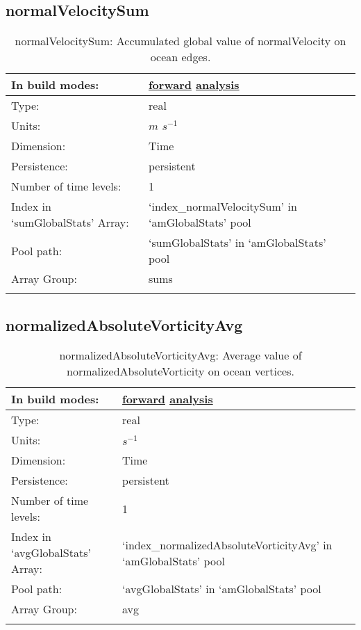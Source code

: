 \subsection[normalVelocitySum]{normalVelocitySum}
\label{subsec:var_sec_amGlobalStats_normalVelocitySum}
\begin{center}
\begin{longtable}{| p{2.0in} | p{4.0in} |}
        \hline 
        In build modes: & \hyperref[subsec:forward_var_tab_amGlobalStats]{forward} \hyperref[subsec:analysis_var_tab_amGlobalStats]{analysis} \\
        \hline 
        Type: & real \\
        \hline 
        Units: & $m$ $s^{-1}$ \\
        \hline 
        Dimension: & Time \\
        \hline 
        Persistence: & persistent \\
        \hline 
        Number of time levels: & 1 \\
        \hline 
		 Index in `sumGlobalStats' Array: & `index\_normalVelocitySum' in `amGlobalStats' pool \\
		 \hline 
            Pool path: & `sumGlobalStats' in `amGlobalStats' pool \\
		 \hline 
		 Array Group: & sums \\
		 \hline 
    \caption{normalVelocitySum: Accumulated global value of normalVelocity on ocean edges.}
\end{longtable}
\end{center}
\subsection[normalizedAbsoluteVorticityAvg]{normalizedAbsoluteVorticityAvg}
\label{subsec:var_sec_amGlobalStats_normalizedAbsoluteVorticityAvg}
\begin{center}
\begin{longtable}{| p{2.0in} | p{4.0in} |}
        \hline 
        In build modes: & \hyperref[subsec:forward_var_tab_amGlobalStats]{forward} \hyperref[subsec:analysis_var_tab_amGlobalStats]{analysis} \\
        \hline 
        Type: & real \\
        \hline 
        Units: & $s^{-1}$ \\
        \hline 
        Dimension: & Time \\
        \hline 
        Persistence: & persistent \\
        \hline 
        Number of time levels: & 1 \\
        \hline 
		 Index in `avgGlobalStats' Array: & `index\_normalizedAbsoluteVorticityAvg' in `amGlobalStats' pool \\
		 \hline 
            Pool path: & `avgGlobalStats' in `amGlobalStats' pool \\
		 \hline 
		 Array Group: & avg \\
		 \hline 
    \caption{normalizedAbsoluteVorticityAvg: Average value of normalizedAbsoluteVorticity on ocean vertices.}
\end{longtable}
\end{center}

